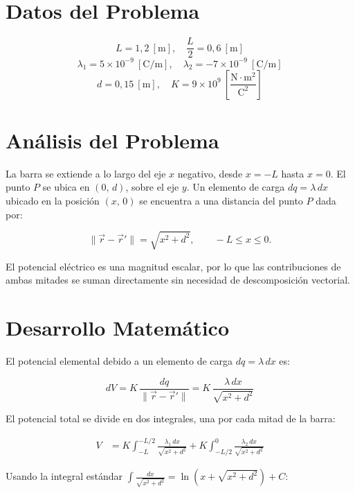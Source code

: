 \documentclass[12pt,letterpaper]{article}
\begin{document}
\section*{Datos del Problema}

\[
    L = 1{,}2\ [\text{m}], \quad \frac{L}{2} = 0{,}6\ [\text{m}]
\]
\[
    \lambda_1 = 5\times10^{-9}\ [\text{C/m}], \quad
    \lambda_2 = -7\times10^{-9}\ [\text{C/m}]
\]
\[
    d = 0{,}15\ [\text{m}], \quad
    K = 9\times10^{9}\ \left[\frac{\text{N}\cdot\text{m}^2}{\text{C}^2}\right]
\]

\section*{An\'alisis del Problema}

La barra se extiende a lo largo del eje $x$ negativo, desde $x = -L$ hasta $x = 0$.
El punto $P$ se ubica en $(0,\,d)$, sobre el eje $y$.
Un elemento de carga $dq = \lambda\,dx$ ubicado en la posici\'on $(x,\,0)$
se encuentra a una distancia del punto $P$ dada por:

\[
    \|\vec{r}-\vec{r}'\| = \sqrt{x^2 + d^2}, \qquad -L \leq x \leq 0.
\]

El potencial el\'ectrico es una magnitud escalar, por lo que las contribuciones
de ambas mitades se suman directamente sin necesidad de descomposici\'on vectorial.

\section*{Desarrollo Matem\'atico}

El potencial elemental debido a un elemento de carga $dq = \lambda\,dx$ es:

\[
    dV = K\,\frac{dq}{\|\vec{r}-\vec{r}'\|}
       = K\,\frac{\lambda\,dx}{\sqrt{x^2+d^2}}
\]

El potencial total se divide en dos integrales, una por cada mitad de la barra:

\begin{align*}
    V &= K\int_{-L}^{-L/2} \frac{\lambda_1\,dx}{\sqrt{x^2+d^2}}
       + K\int_{-L/2}^{0} \frac{\lambda_2\,dx}{\sqrt{x^2+d^2}}
\end{align*}

Usando la integral est\'andar
$\displaystyle\int \frac{dx}{\sqrt{x^2+d^2}} = \ln\!\left(x + \sqrt{x^2+d^2}\right) + C$:
\end{document}
